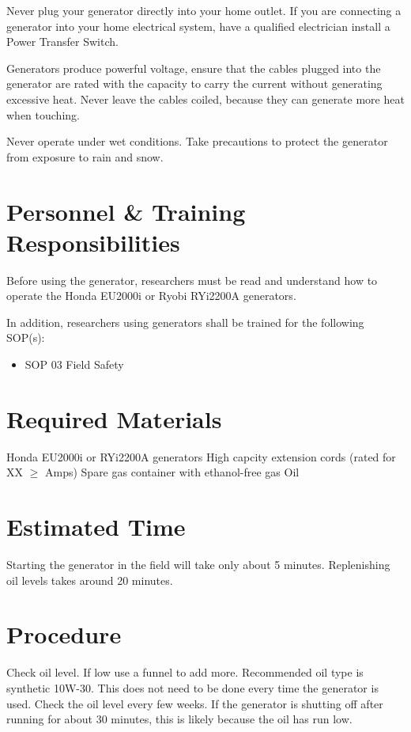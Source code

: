 \documentclass[12pt]{../SOP3_beta}
\begin{document}
\NP Never plug your generator directly into your home outlet. If you are connecting a generator into your home electrical system, have a qualified electrician install a Power Transfer Switch.

\NP Generators produce powerful voltage, ensure that the cables plugged into the generator are rated with the capacity to carry the current without generating excessive heat. Never leave the cables coiled, because they can generate more heat when touching.

\NP Never operate under wet conditions. Take precautions to protect the generator from exposure to rain and snow. 

\section{Personnel \& Training Responsibilities}

\NP Before using the generator, researchers must be read and understand how to operate the Honda EU2000i or Ryobi RYi2200A generators. 

\NP In addition, researchers using generators shall be trained for the following SOP(s):

\begin{itemize}
  \item SOP 03 Field Safety
\end{itemize}

\section{Required Materials}

\NP Honda EU2000i or RYi2200A generators
\NP High capcity extension cords (rated for XX $\geq$ Amps)
\NP Spare gas container with ethanol-free gas
\NP Oil

\section{Estimated Time}

\NP Starting the generator in the field will take only about 5 minutes. Replenishing oil levels takes around 20 minutes. 

\section{Procedure}

\NP Check oil level. If low use a funnel to add more. Recommended oil type is synthetic 10W-30. This does not need to be done every time the generator is used. Check the oil level every few weeks. If the generator is shutting off after running for about 30 minutes, this is likely because the oil has run low.
\end{document}
